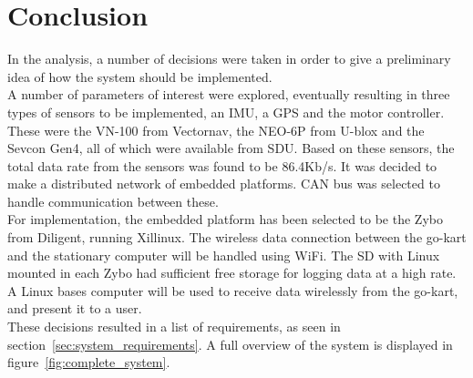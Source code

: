





\section{Conclusion}
\label{sec:analysisconclusion}
In the analysis, a number of decisions were taken in order to give a preliminary idea of how the system should be implemented. \\

A number of parameters of interest were explored, eventually resulting in three types of sensors to be implemented, an IMU, a GPS and the motor controller.
These were the VN-100 from Vectornav, the NEO-6P from U-blox and the Sevcon Gen4, all of which were available from SDU.
Based on these sensors, the total data rate from the sensors was found to be 86.4Kb/s.
It was decided to make a distributed network of embedded platforms. 
CAN bus was selected to handle communication between these.\\

For implementation, the embedded platform has been selected to be the Zybo from Diligent, running Xillinux.
The wireless data connection between the go-kart and the stationary computer will be handled using WiFi.
The SD with Linux mounted in each Zybo had sufficient free storage for logging data at a high rate.
A Linux bases computer will be used to receive data wirelessly from the go-kart, and present it to a user. \\

These decisions resulted in a list of requirements, as seen in section~\ref{sec:system_requirements}.
A full overview of the system is displayed in figure~\ref{fig:complete_system}.

